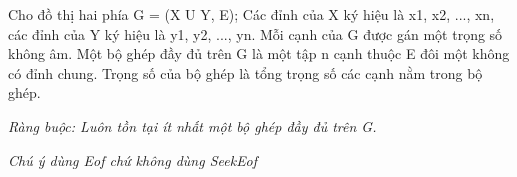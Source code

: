 Cho đồ thị hai phía G = (X U Y, E); Các đỉnh của X ký hiệu là x1, x2, ..., xn, các đỉnh của Y ký hiệu là y1, y2, ..., yn. Mỗi cạnh của G được gán một trọng số không âm. Một bộ ghép đầy đủ trên G là một tập n cạnh thuộc E đôi một không có đỉnh chung. Trọng số của  bộ ghép là tổng trọng số các cạnh nằm trong bộ ghép.   





\textit{    Ràng buộc: Luôn tồn tại ít nhất một bộ ghép đầy đủ trên G.   }


\textit{    Chú ý dùng         Eof        chứ không dùng         SeekEof       }
